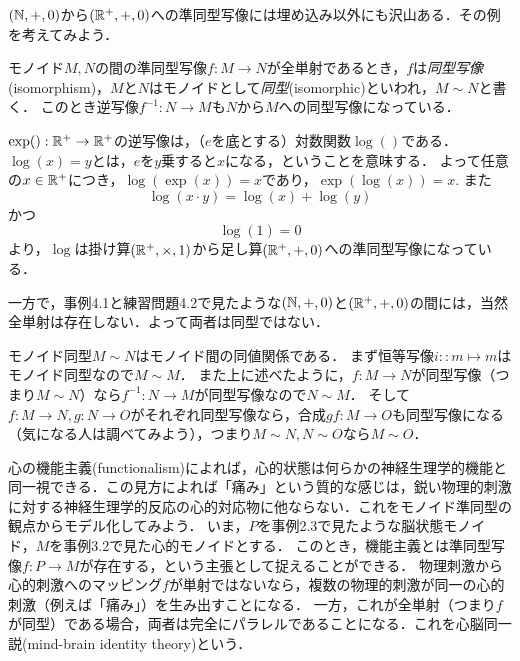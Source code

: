 \documentclass[11pt,a4paper, dvipdfmx]{jsarticle}
\begin{document}
\begin{exercise}
    $(\mathbb{N}, +, 0)$から$(\mathbb{R}^+, +, 0)$への準同型写像には埋め込み以外にも沢山ある．その例を考えてみよう．
\end{exercise}


\begin{dfn}[同型]
    モノイド$M, N$の間の準同型写像$f:M \to N$が全単射であるとき，$f$は\emph{同型写像}(isomorphism)，$M$と$N$はモノイドとして\emph{同型}(isomorphic)といわれ，$M \sim N$と書く．
    このとき逆写像$f^{-1}:N \to M$も$N$から$M$への同型写像になっている．
\end{dfn}

\begin{example}
    $\exp():\mathbb{R}^+ \to \mathbb{R}^+$の逆写像は，（$e$を底とする）対数関数$\log()$である．
    $\log(x)=y$とは，$e$を$y$乗すると$x$になる，ということを意味する．
    よって任意の$x\in\mathbb{R}^+$につき，$\log(\exp(x))=x$であり，$\exp(\log(x))=x$. また
    \[ \log(x \cdot y) = \log(x) + \log(y) \]
    かつ
    \[ \log(1) = 0 \]
    より，$\log$は掛け算$(\mathbb{R}^+, \times, 1)$から足し算$(\mathbb{R}^+, +, 0)$への準同型写像になっている．

    一方で，事例4.1と練習問題4.2で見たような$(\mathbb{N}, +, 0)$と$(\mathbb{R}^+, +, 0)$の間には，当然全単射は存在しない．よって両者は同型ではない．
\end{example}


モノイド同型$M \sim N$はモノイド間の同値関係である．
まず恒等写像$i::m \mapsto m$はモノイド同型なので$M \sim M$．
また上に述べたように，$f:M \to N$が同型写像（つまり$M \sim N$）なら$f^{-1}:N \to M$が同型写像なので$N \sim M$．
そして$f:M \to N, g:N \to O$がそれぞれ同型写像なら，合成$gf:M \to O$も同型写像になる（気になる人は調べてみよう），つまり$M \sim N, N \sim O$なら$M \sim O$．



\begin{example}
    心の機能主義(functionalism)によれば，心的状態は何らかの神経生理学的機能と同一視できる．この見方によれば「痛み」という質的な感じは，鋭い物理的刺激に対する神経生理学的反応の心的対応物に他ならない．これをモノイド準同型の観点からモデル化してみよう．
    いま，$P$を事例2.3で見たような脳状態モノイド，$M$を事例3.2で見た心的モノイドとする．
    このとき，機能主義とは準同型写像$f:P \to M$が存在する，という主張として捉えることができる．
    物理刺激から心的刺激へのマッピング$f$が単射ではないなら，複数の物理的刺激が同一の心的刺激（例えば「痛み」）を生み出すことになる．
    一方，これが全単射（つまり$f$が同型）である場合，両者は完全にパラレルであることになる．これを心脳同一説(mind-brain identity theory)という．
\end{example}
\end{document}
